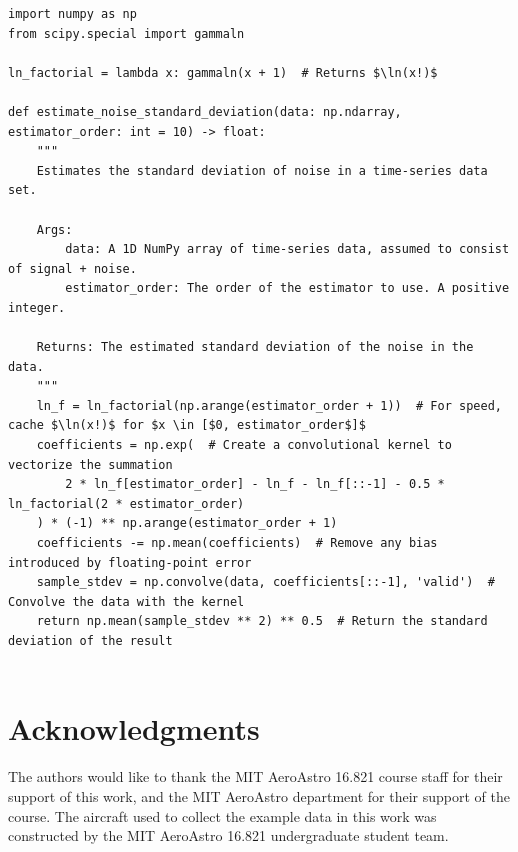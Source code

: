 \begin{listing}[H]
    \begin{verbatim}
import numpy as np
from scipy.special import gammaln

ln_factorial = lambda x: gammaln(x + 1)  # Returns $\ln(x!)$

def estimate_noise_standard_deviation(data: np.ndarray, estimator_order: int = 10) -> float:
    """
    Estimates the standard deviation of noise in a time-series data set.

    Args:
        data: A 1D NumPy array of time-series data, assumed to consist of signal + noise.
        estimator_order: The order of the estimator to use. A positive integer.

    Returns: The estimated standard deviation of the noise in the data.
    """
    ln_f = ln_factorial(np.arange(estimator_order + 1))  # For speed, cache $\ln(x!)$ for $x \in [$0, estimator_order$]$
    coefficients = np.exp(  # Create a convolutional kernel to vectorize the summation
        2 * ln_f[estimator_order] - ln_f - ln_f[::-1] - 0.5 * ln_factorial(2 * estimator_order)
    ) * (-1) ** np.arange(estimator_order + 1)
    coefficients -= np.mean(coefficients)  # Remove any bias introduced by floating-point error
    sample_stdev = np.convolve(data, coefficients[::-1], 'valid')  # Convolve the data with the kernel
    return np.mean(sample_stdev ** 2) ** 0.5  # Return the standard deviation of the result


    \end{verbatim}
    \caption{Example efficient implementation of the arbitrary-order noise estimator using NumPy/SciPy in Python 3.}
    \label{listing:efficient_arbitrary_order_noise_estimator}
\end{listing}

\section*{Acknowledgments}
The authors would like to thank the MIT AeroAstro 16.821 course staff for their support of this work, and the MIT AeroAstro department for their support of the course. The aircraft used to collect the example data in this work was constructed by the MIT AeroAstro 16.821 undergraduate student team.

%    
